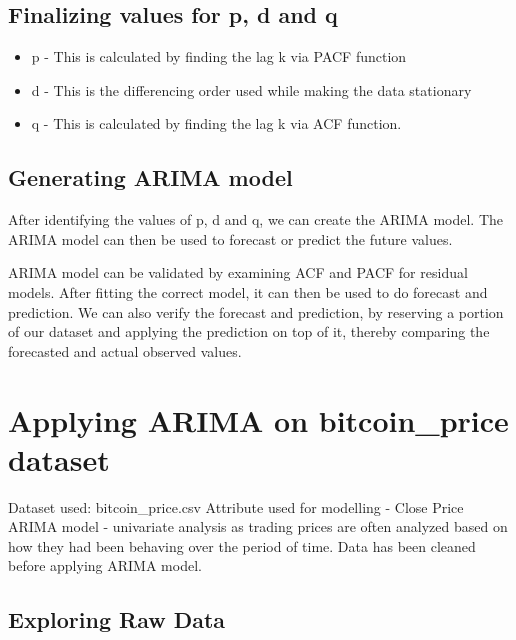 \documentclass{article}
\begin{document}
\subsection{Finalizing values for p, d and q}

\begin{itemize}
	\item p - This is calculated by finding the lag k via PACF function
	\item d - This is the differencing order used while making the data stationary
	\item q - This is calculated by finding the lag k via ACF function.
\end{itemize}

\subsection{Generating ARIMA model}

After identifying the values of p, d and q, we can create the ARIMA model.
The ARIMA model can then be used to forecast or predict the future values.\linebreak

ARIMA model can be validated by examining ACF and PACF for residual models.
After fitting the correct model, it can then be used to do forecast and prediction.\linebreak
We can also verify the forecast and prediction, by reserving a portion of our dataset and applying the prediction on top of it, thereby comparing the forecasted and actual
observed values.



\section{Applying ARIMA on bitcoin\_price dataset}

Dataset used: bitcoin\_price.csv  \linebreak
Attribute used for modelling - Close Price  \linebreak
ARIMA model - univariate analysis as trading prices are often analyzed based on how they had been behaving over the period of time. \linebreak
Data has been cleaned before applying ARIMA model. \linebreak

\subsection{Exploring Raw Data}
\end{document}
